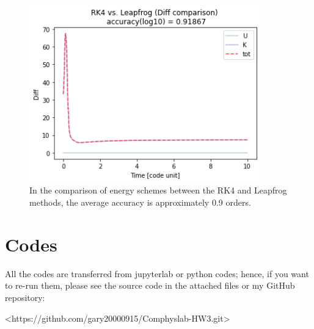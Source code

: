 \documentclass[12pt]{article}
\begin{document}
  \begin{figure}[H]
    \centering 
    \includegraphics[width = 10cm]{RK4_D.png}
    \caption{In the comparison of energy schemes between the RK4 and Leapfrog methods, the average accuracy is approximately 0.9 orders.}
    \label{RK4_LF}
  \end{figure}


\section{Codes}
    All the codes are transferred from jupyterlab or python codes; hence, if you want to re-run them, please see the source code in the attached files or my GitHub repository: \newline
    {\centerline{\ttfamily <https://github.com/gary20000915/Comphyslab-HW3.git>}}
\end{document}
